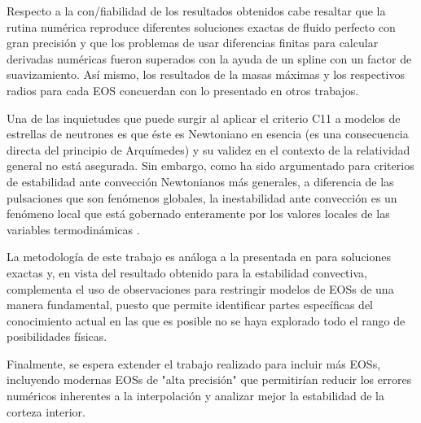 Respecto a la con/fiabilidad de los resultados obtenidos cabe resaltar que la rutina numérica reproduce diferentes soluciones exactas de fluido perfecto con gran precisión y que los problemas de usar diferencias finitas para calcular derivadas numéricas fueron superados con la ayuda de un spline con un factor de suavizamiento. Así mismo, los resultados de la masas máximas y los respectivos radios para cada EOS concuerdan con lo presentado en otros trabajos.

Una de las inquietudes que puede surgir al aplicar el criterio C11 a modelos de estrellas de neutrones es que éste es Newtoniano en esencia (es una consecuencia directa del principio de Arquímedes) y su validez en el contexto de la relatividad general no está asegurada. Sin embargo, como ha sido argumentado para criterios de estabilidad ante convección Newtonianos más generales, a diferencia de las pulsaciones que son fenómenos globales, la inestabilidad ante convección es un fenómeno local que está gobernado enteramente por los valores locales de las variables termodinámicas \cite{Thorne1966}.    

La metodología de este trabajo es análoga a la presentada en \cite{Delgaty1998} para soluciones exactas y, en vista del resultado obtenido para la estabilidad convectiva, complementa el uso de observaciones para restringir modelos de EOSs de una manera fundamental, puesto que permite identificar partes específicas del conocimiento actual en las que es posible no se haya explorado todo el rango de posibilidades físicas.

Finalmente, se espera extender el trabajo realizado para incluir más EOSs, incluyendo modernas EOSs de "alta precisión" que permitirían reducir los errores numéricos inherentes a la interpolación y analizar mejor la estabilidad de la corteza interior.